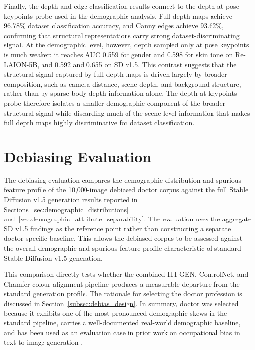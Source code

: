 Finally, the depth and edge classification results connect to the depth-at-pose-keypoints probe used in the demographic analysis. Full depth maps achieve 96.78\% dataset classification accuracy, and Canny edges achieve 93.62\%, confirming that structural representations carry strong dataset-discriminating signal. At the demographic level, however, depth sampled only at pose keypoints is much weaker: it reaches AUC 0.559 for gender and 0.598 for skin tone on Re-LAION-5B, and 0.592 and 0.655 on SD v1.5. This contrast suggests that the structural signal captured by full depth maps is driven largely by broader composition, such as camera distance, scene depth, and background structure, rather than by sparse body-depth information alone. The depth-at-keypoints probe therefore isolates a smaller demographic component of the broader structural signal while discarding much of the scene-level information that makes full depth maps highly discriminative for dataset classification.

\section{Debiasing Evaluation}
\label{sec:debiasing_evaluation}

The debiasing evaluation compares the demographic distribution and spurious feature profile of the 10,000-image debiased doctor corpus against the full Stable Diffusion v1.5 generation results reported in Sections~\ref{sec:demographic_distributions} and~\ref{sec:demographic_attribute_separability}. The evaluation uses the aggregate SD v1.5 findings as the reference point rather than constructing a separate doctor-specific baseline. This allows the debiased corpus to be assessed against the overall demographic and spurious-feature profile characteristic of standard Stable Diffusion v1.5 generation.

This comparison directly tests whether the combined ITI-GEN, ControlNet, and Chamfer colour alignment pipeline produces a measurable departure from the standard generation profile. The rationale for selecting the doctor profession is discussed in Section~\ref{subsec:debias_design}. In summary, doctor was selected because it exhibits one of the most pronounced demographic skews in the standard pipeline, carries a well-documented real-world demographic baseline, and has been used as an evaluation case in prior work on occupational bias in text-to-image generation \cite{Bianchi_2023_TTIGenAmplifiesDemographicStereotypes, Luccioni_2023_AnalyzingSocietalRepresentationsDiffusionModels}.

